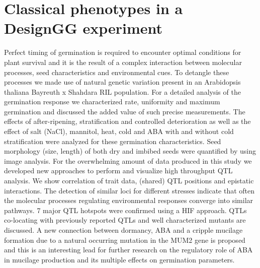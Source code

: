 \documentclass[8pt, twoside, a5paper]{report}
\begin{document}
\section{Classical phenotypes in a DesignGG experiment}
Perfect timing of germination is required to encounter optimal conditions for plant survival and it is the result of a complex 
interaction between molecular processes, seed characteristics and environmental cues. To detangle these processes we made use 
of natural genetic variation present in an Arabidopsis thaliana Bayreuth x Shahdara RIL population. For a detailed analysis of 
the germination response we characterized rate, uniformity and maximum germination and discussed the added value of such precise
measurements. The effects of after-ripening, stratification and controlled deterioration as well as the effect of salt (NaCl), 
mannitol, heat, cold and ABA with and without cold stratification were analyzed for these germination characteristics. Seed 
morphology (size, length) of both dry and imbibed seeds were quantified by using image analysis. For the overwhelming amount 
of data produced in this study we developed new approaches to perform and visualize high throughput QTL analysis. We show 
correlation of trait data, (shared) QTL positions and epistatic interactions. The detection of similar loci for different 
stresses indicate that often the molecular processes regulating environmental responses converge into similar pathways. 7 major 
QTL hotspots were confirmed using a HIF approach. QTLs co-locating with previously reported QTLs and well characterized mutants 
are discussed. A new connection between dormancy, ABA and a cripple mucilage formation due to a natural occurring mutation in the
MUM2 gene is proposed and this is an interesting lead for further research on the regulatory role of ABA in mucilage production 
and its multiple effects on germination parameters.
\end{document}
